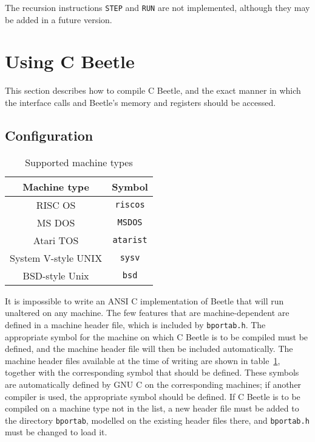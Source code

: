 The recursion instructions {\tt STEP} and {\tt RUN} are not implemented,
although they may be added in a future version.


\section{Using C Beetle}

This section describes how to compile C Beetle, and the exact manner in which
the interface calls and Beetle's memory and registers should be accessed.


\subsection{Configuration}
\label{configuration}

\begin{table}
\begin{center}
\begin{tabular}{|c|c|} \hline
\rule[-2mm]{0mm}{6mm}\bf Machine type & \bf Symbol \\ \hline
RISC OS & {\tt riscos} \\
MS DOS & {\tt MSDOS} \\
Atari TOS & {\tt atarist} \\
System V-style UNIX & {\tt sysv} \\
BSD-style Unix & {\tt bsd} \\
\hline
\end{tabular}
\caption{\label{machtab}Supported machine types}
\end{center}
\end{table}

It is impossible to write an ANSI C implementation of Beetle that will run
unaltered on any machine. The few features that are machine-dependent are
defined in a machine header file, which is included by {\tt bportab.h}. The
appropriate symbol for the machine on which C Beetle is to be compiled must
be defined, and the machine header file will then be included automatically.
The machine header files available at the time of writing are shown in
table~\ref{machtab}, together with the corresponding symbol that should be
defined. These symbols are automatically defined by GNU C on the
corresponding machines; if another compiler is used, the appropriate symbol
should be defined. If C Beetle is to be compiled on a machine type not in the
list, a new header file must be added to the directory {\tt bportab},
modelled on the existing header files there, and {\tt bportab.h} must be
changed to load it.

